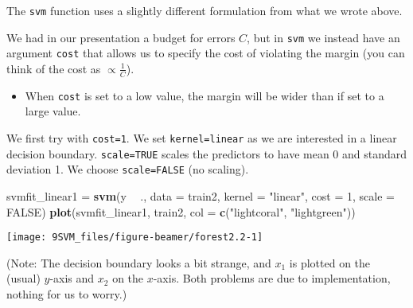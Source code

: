 \documentclass[10pt,ignorenonframetext,]{beamer}
\newenvironment{Shaded}{\begin{snugshade}}{\end{snugshade}}
\newcommand{\KeywordTok}[1]{\textcolor[rgb]{0.13,0.29,0.53}{\textbf{#1}}}
\newcommand{\DataTypeTok}[1]{\textcolor[rgb]{0.13,0.29,0.53}{#1}}
\newcommand{\DecValTok}[1]{\textcolor[rgb]{0.00,0.00,0.81}{#1}}
\newcommand{\StringTok}[1]{\textcolor[rgb]{0.31,0.60,0.02}{#1}}
\newcommand{\OtherTok}[1]{\textcolor[rgb]{0.56,0.35,0.01}{#1}}
\newcommand{\OperatorTok}[1]{\textcolor[rgb]{0.81,0.36,0.00}{\textbf{#1}}}
\newcommand{\NormalTok}[1]{#1}
\providecommand{\tightlist}{%
  \setlength{\itemsep}{0pt}\setlength{\parskip}{0pt}}
\begin{document}
\begin{frame}[fragile]

The \texttt{svm} function uses a slightly different formulation from
what we wrote above.

We had in our presentation a budget for errors \(C\), but in
\texttt{svm} we instead have an argument \texttt{cost} that allows us to
specify the cost of violating the margin (you can think of the cost as
\(\propto \frac{1}{C}\)).

\begin{itemize}
\tightlist
\item
  When \texttt{cost} is set to a low value, the margin will be wider
  than if set to a large value.
\end{itemize}

We first try with \texttt{cost=1}. We set
\texttt{kernel=\textquotesingle{}linear\textquotesingle{}} as we are
interested in a linear decision boundary. \texttt{scale=TRUE} scales the
predictors to have mean 0 and standard deviation 1. We choose
\texttt{scale=FALSE} (no scaling).

\end{frame}

\begin{frame}[fragile]

\footnotesize

\begin{Shaded}
\begin{Highlighting}[]
\NormalTok{svmfit_linear1 =}\StringTok{ }\KeywordTok{svm}\NormalTok{(y }\OperatorTok{~}\StringTok{ }\NormalTok{., }\DataTypeTok{data =}\NormalTok{ train2, }\DataTypeTok{kernel =} \StringTok{"linear"}\NormalTok{, }\DataTypeTok{cost =} \DecValTok{1}\NormalTok{, }
    \DataTypeTok{scale =} \OtherTok{FALSE}\NormalTok{)}
\KeywordTok{plot}\NormalTok{(svmfit_linear1, train2, }\DataTypeTok{col =} \KeywordTok{c}\NormalTok{(}\StringTok{"lightcoral"}\NormalTok{, }\StringTok{"lightgreen"}\NormalTok{))}
\end{Highlighting}
\end{Shaded}

\begin{center}\texttt{[image: 9SVM\_files/figure-beamer/forest2.2-1]} \end{center}

(Note: The decision boundary looks a bit strange, and \(x_1\) is plotted
on the (usual) \(y\)-axis and \(x_2\) on the \(x\)-axis. Both problems
are due to implementation, nothing for us to worry.)

\end{frame}
\end{document}
